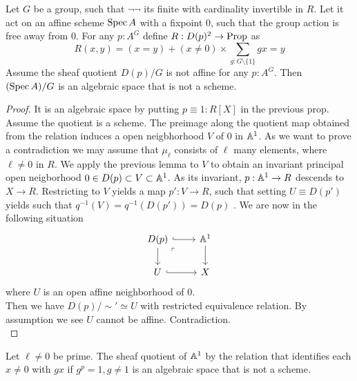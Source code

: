 \begin{prop}
	Let $G$ be a group, such that $\lnot \lnot$ its finite with cardinality invertible in $R$. Let it act on an affine scheme $\operatorname{Spec} A$ with a fixpoint 0, such that the group action is free away from 0.
	For any $p : A^G$ define $R: D(p)^2 \to \operatorname{Prop}$ as
	\[
	R(x,y) = (x = y) + (x \neq 0) \times \sum_{g : G \setminus \{1\}} g x = y
	\]
	Assume the sheaf quotient $D(p) / G$ is not affine for any $p : A^G$. Then $(\operatorname{Spec} A) / G$ is an algebraic space that is not a scheme.
\end{prop}
\begin{proof}
	It is an algebraic space by putting $p \equiv 1 : R[X]$ in the previous prop. \\
	Assume the quotient is a scheme. 
	The preimage along the quotient map obtained from the relation induces a open neigbhorhood $V$ of $0$ in $\mathbb{A}^1$. As we want to prove a contradiction we may assume that $\mu_\ell$ consists of $\ell$ many elements, where $\ell \neq 0 $ in $R$. We apply the previous lemma to $V$ to obtain an invariant principal open neigborhood $0 \in D(p) \subset V \subset \mathbb{A}^1$. As its invariant, $p : \mathbb{A}^1 \to R$ descends to $X \to R$. Restricting to $V$ yields a map $p' : V \to R$, such that setting $U \equiv D(p')$ yields such that $q^{-1}(V) =q^{-1}(D(p')) = D(p)$ . We are now in the following situation
	\[\begin{tikzcd}
		{D(p)} & {\bA^1} \\
		U & X
		\arrow[hook, from=1-1, to=1-2]
		\arrow[from=1-1, to=2-1]
		\arrow["\ulcorner"{anchor=center, pos=0.125}, draw=none, from=1-1, to=2-2]
		\arrow[from=1-2, to=2-2]
		\arrow[hook, from=2-1, to=2-2]
	\end{tikzcd}\]
	where $U$ is an open affine neighborhood of 0. \\
	Then we have $D(p) / \sim' \simeq U$ with restricted equivalence relation. By assumption we see $U$ cannot be affine. Contradiction.\\		
\end{proof}
\begin{corollary}
	Let $\ell \neq 0$ be prime. The sheaf quotient of $\mathbb{A}^1$ by the relation that identifies each  $x \neq 0$ with $g x$ if $g^p = 1, g \neq 1$ is an algebraic space that is not a scheme.
\end{corollary}
